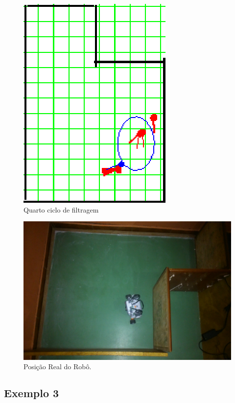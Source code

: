 \begin{figure}[H]
  \centering
  \includegraphics[scale=1]{figuras/cen4_ex2/5.eps}
  \caption[Quarto Ciclo de Filtragem]{Quarto ciclo de filtragem}
  \label{img:cen4_ex2_5}
\end{figure}

\begin{figure}[H]
  \centering
  \includegraphics[scale=1]{figuras/cen4_ex2/real.eps}
  \caption[Posição Real do Robô]{Posição Real do Robô.}
  \label{img:cen4_ex2_real}
\end{figure}


\subsection{Exemplo 3}


